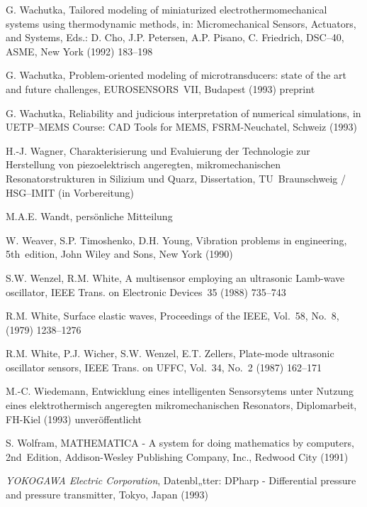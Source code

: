 \begin{thebibliography}{xxx}
 G. Wachutka, Tailored modeling of miniaturized electrothermomechanical
 systems using thermodynamic methods, in: Micromechanical Sensors,
 Actuators, and Systems, Eds.: D. Cho, J.P. Petersen, A.P. Pisano,
 C. Friedrich, DSC--40, ASME, New York (1992) 183--198

 G. Wachutka, Problem-oriented modeling of microtransducers: state of the
 art and future challenges, EUROSENSORS~VII, Budapest (1993) preprint

 G. Wachutka, Reliability and judicious interpretation of numerical
 simulations, in UETP--MEMS Course: CAD Tools for MEMS, FSRM-Neuchatel,
 Schweiz (1993)

 H.-J. Wagner, Charakterisierung und Evaluierung der Technologie zur
 Herstellung von piezoelektrisch angeregten, mikromechanischen
 Resonatorstrukturen in Silizium und Quarz, Dissertation,
 TU~Braunschweig / HSG--IMIT (in Vorbereitung)

 M.A.E. Wandt, persönliche Mitteilung

 W. Weaver, S.P. Timoshenko, D.H. Young, Vibration problems in engineering,
 5th~edition, John Wiley and Sons, New York (1990)

 S.W. Wenzel, R.M. White, A multisensor employing an ultrasonic Lamb-wave
 oscillator, IEEE Trans. on Electronic Devices~35 (1988) 735--743

 R.M. White, Surface elastic waves, Proceedings of the IEEE, Vol.~58, No.~8,
 (1979) 1238--1276

 R.M. White, P.J. Wicher, S.W. Wenzel, E.T. Zellers, Plate-mode ultrasonic
 oscillator sensors, IEEE Trans. on UFFC, Vol.~34, No.~2 (1987) 162--171

 M.-C. Wiedemann, Entwicklung eines intelligenten Sensorsytems unter Nutzung
 eines elektrothermisch angeregten mikromechanischen Resonators,
 Diplomarbeit, FH-Kiel (1993) unveröffentlicht

 S. Wolfram, {\sf MATHEMATICA} - A system for doing mathematics by computers,
 2nd~Edition, Addison-Wesley Publishing Company, Inc., Redwood City (1991)

 {\em YOKOGAWA Electric Corporation}, Datenbl„tter: {\sf DPharp} -
 Differential pressure and pressure transmitter, Tokyo, Japan (1993)


\end{thebibliography}
